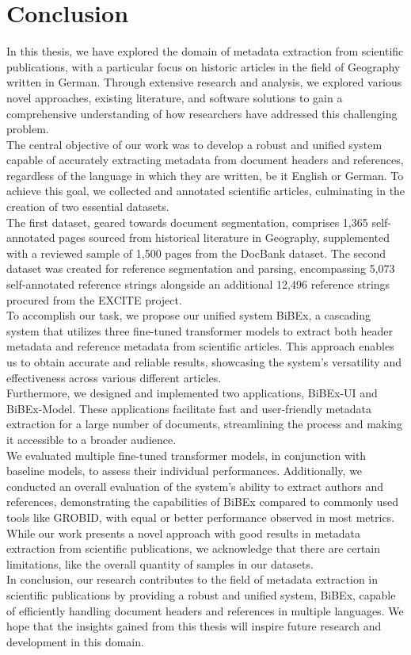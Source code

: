 \chapter{Conclusion}\label{chap:conclusion}
In this thesis, we have explored the domain of metadata extraction from scientific publications, with a particular focus on historic articles in the field of Geography written in German. Through extensive research and analysis, we explored various novel approaches, existing literature, and software solutions to gain a comprehensive understanding of how researchers have addressed this challenging problem.\\
The central objective of our work was to develop a robust and unified system capable of accurately extracting metadata from document headers and references, regardless of the language in which they are written, be it English or German. To achieve this goal, we collected and annotated scientific articles, culminating in the creation of two essential datasets.\\
The first dataset, geared towards document segmentation, comprises 1,365 self-annotated pages sourced from historical literature in Geography, supplemented with a reviewed sample of 1,500 pages from the DocBank dataset. The second dataset was created for reference segmentation and parsing, encompassing 5,073 self-annotated reference strings alongside an additional 12,496 reference strings procured from the EXCITE project.\\
To accomplish our task, we propose our unified system BiBEx, a cascading system that utilizes three fine-tuned transformer models to extract both header metadata and reference metadata from scientific articles. This approach enables us to obtain accurate and reliable results, showcasing the system's versatility and effectiveness across various different articles.\\
Furthermore, we designed and implemented two applications, BiBEx-UI and BiBEx-Model. These applications facilitate fast and user-friendly metadata extraction for a large number of documents, streamlining the process and making it accessible to a broader audience.\\
We evaluated multiple fine-tuned transformer models, in conjunction with baseline models, to assess their individual performances. Additionally, we conducted an overall evaluation of the system's ability to extract authors and references, demonstrating the capabilities of BiBEx compared to commonly used tools like GROBID, with equal or better performance observed in most metrics.\\
While our work presents a novel approach with good results in metadata extraction from scientific publications, we acknowledge that there are certain limitations, like the overall quantity of samples in our datasets. \\
In conclusion, our research contributes to the field of metadata extraction in scientific publications by providing a robust and unified system, BiBEx, capable of efficiently handling document headers and references in multiple languages. We hope that the insights gained from this thesis will inspire future research and development in this domain.

